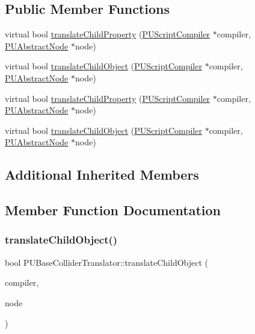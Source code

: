 \subsection*{Public Member Functions}
\begin{DoxyCompactItemize}
\item 
virtual bool \hyperlink{classPUBaseColliderTranslator_a4de26b00ae2aa23adfe7de076e7a0888}{translate\+Child\+Property} (\hyperlink{classPUScriptCompiler}{P\+U\+Script\+Compiler} $\ast$compiler, \hyperlink{classPUAbstractNode}{P\+U\+Abstract\+Node} $\ast$node)
\item 
virtual bool \hyperlink{classPUBaseColliderTranslator_abc2cb0d0a53fc1b0e0a91f96fb5b5416}{translate\+Child\+Object} (\hyperlink{classPUScriptCompiler}{P\+U\+Script\+Compiler} $\ast$compiler, \hyperlink{classPUAbstractNode}{P\+U\+Abstract\+Node} $\ast$node)
\item 
virtual bool \hyperlink{classPUBaseColliderTranslator_ad0d0dc1bdeaea1af3989bcfecd99eef8}{translate\+Child\+Property} (\hyperlink{classPUScriptCompiler}{P\+U\+Script\+Compiler} $\ast$compiler, \hyperlink{classPUAbstractNode}{P\+U\+Abstract\+Node} $\ast$node)
\item 
virtual bool \hyperlink{classPUBaseColliderTranslator_a23c345d7c8c59fcd788724953fdc3623}{translate\+Child\+Object} (\hyperlink{classPUScriptCompiler}{P\+U\+Script\+Compiler} $\ast$compiler, \hyperlink{classPUAbstractNode}{P\+U\+Abstract\+Node} $\ast$node)
\end{DoxyCompactItemize}
\subsection*{Additional Inherited Members}


\subsection{Member Function Documentation}
\mbox{\label{classPUBaseColliderTranslator_abc2cb0d0a53fc1b0e0a91f96fb5b5416}} 
\subsubsection{\texorpdfstring{translate\+Child\+Object()}{translateChildObject()}\hspace{0.1cm}{\footnotesize\ttfamily [1/2]}}
{\footnotesize\ttfamily bool P\+U\+Base\+Collider\+Translator\+::translate\+Child\+Object (\begin{DoxyParamCaption}\item[{\hyperlink{classPUScriptCompiler}{P\+U\+Script\+Compiler} $\ast$}]{compiler,  }\item[{\hyperlink{classPUAbstractNode}{P\+U\+Abstract\+Node} $\ast$}]{node }\end{DoxyParamCaption})\hspace{0.3cm}{\ttfamily [virtual]}}

